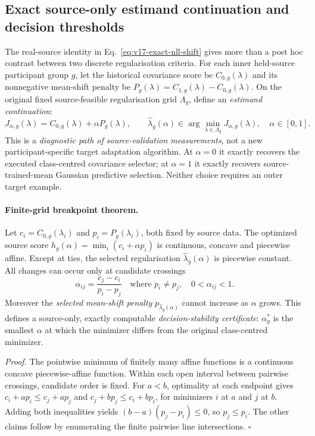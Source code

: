 \subsection{Exact source-only estimand continuation and decision thresholds}
\label{sec:v19-estimand-homotopy}
The real-source identity in Eq.~\eqref{eq:v17-exact-nll-shift}
gives more than a post hoc contrast between two discrete
regularisation criteria. For each inner held-source participant
group $g$, let the historical covariance score be
$C_{0,g}(\lambda)$ and its nonnegative mean-shift penalty
be $P_g(\lambda)=C_{1,g}(\lambda)-C_{0,g}(\lambda)$.
On the original fixed source-feasible regularisation grid
$\Lambda_g$, define an \emph{estimand continuation}:
\begin{equation}
\label{eq:v19-estimand-continuation}
  J_{\alpha,g}(\lambda)=C_{0,g}(\lambda)
                +\alpha P_g(\lambda),\qquad
  \widehat\lambda_g(\alpha)
     \in\arg\min_{\lambda\in\Lambda_g}J_{\alpha,g}(\lambda),
  \quad \alpha\in[0,1].
\end{equation}
This is a \emph{diagnostic path of source-validation
measurements}, not a new participant-specific target
adaptation algorithm. At $\alpha=0$ it exactly recovers the
executed class-centred covariance selector; at $\alpha=1$
it exactly recovers source-trained-mean Gaussian predictive
selection. Neither choice requires an outer target example.

\paragraph{Finite-grid breakpoint theorem.}
Let $c_i=C_{0,g}(\lambda_i)$ and
$p_i=P_g(\lambda_i)$, both fixed by source data.
The optimized source score
$h_g(\alpha)=\min_i(c_i+\alpha p_i)$
is continuous, concave and piecewise affine.
Except at ties, the selected regularisation
$\widehat\lambda_g(\alpha)$ is piecewise constant.
All changes can occur only at candidate crossings
\[
\alpha_{ij}=\frac{c_j-c_i}{p_i-p_j}
\quad\text{where }p_i\ne p_j,\quad 0<\alpha_{ij}<1.
\]
Moreover the \emph{selected mean-shift penalty}
$p_{\widehat\lambda_g(\alpha)}$ cannot increase
as $\alpha$ grows. This defines a source-only,
exactly computable \emph{decision-stability
certificate}: $\alpha_g^*$ is the smallest
$\alpha$ at which the minimizer differs from
the original class-centred minimizer.

\emph{Proof.}
The pointwise minimum of finitely many affine
functions is a continuous concave piecewise-affine
function. Within each open interval between
pairwise crossings, candidate order is fixed.
For $a<b$, optimality at each endpoint gives
$c_i+a p_i\le c_j+a p_j$ and
$c_j+b p_j\le c_i+b p_i$, for minimizers
$i$ at $a$ and $j$ at $b$.
Adding both inequalities yields
$(b-a)(p_j-p_i)\le0$, so $p_j\le p_i$.
The other claims follow by enumerating the
finite pairwise line intersections.
\hfill$\square$

